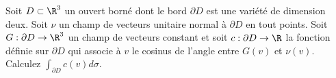 
\begin{exercice}\label{exoVariete0014}

Soit $D \subset \R^3$ un ouvert borné dont le bord $\partial D$ est une 
variété de dimension deux. Soit $\nu$ un champ de vecteurs unitaire 
normal à $\partial D$ en tout points. Soit $G: \partial D \rightarrow 
\R^3$ un champ de vecteurs constant et soit $c: \partial D \rightarrow  \R$ 
la fonction définie sur $\partial D$ qui associe à $v$ le cosinus de 
l'angle entre $G(v)$ et $\nu(v)$. Calculez $\int_{\partial D} c(v) d \sigma 
$.

\end{exercice}
